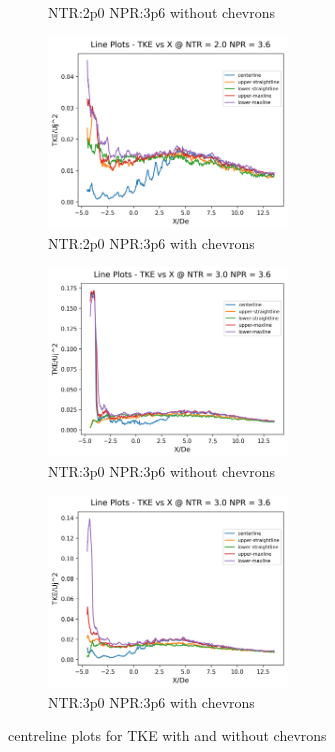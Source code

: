 \begin{figure}[H]
\begin{subfigure}{.5\textwidth}
	\caption{NTR:2p0 NPR:3p6 without chevrons}
	\label{fig:lineplotsTKE2p03p6}
\end{subfigure}%
\begin{subfigure}{.5\textwidth}
	\centering
	\includegraphics[width=2.5in]{images/LinePlots_TKE_NTR2p0_NPR3p6c.png}
	\caption{NTR:2p0 NPR:3p6 with chevrons}
	\label{fig:lineplotsTKE2p03p6c}
\end{subfigure}
\begin{subfigure}{.5\textwidth}
	\centering
	\includegraphics[width=2.5in]{images/LinePlots_TKE_NTR3p0_NPR3p6.png}
	\caption{NTR:3p0 NPR:3p6 without chevrons}
	\label{fig:lineplotsTKE3p03p6}
\end{subfigure}%
\begin{subfigure}{.5\textwidth}
	\centering
	\includegraphics[width=2.5in]{images/LinePlots_TKE_NTR3p0_NPR3p6c.png}
	\caption{NTR:3p0 NPR:3p6 with chevrons}
	\label{fig:lineplotsTKE3p03p6c}
\end{subfigure}
\caption{centreline plots for TKE with and without chevrons }
\label{fig:lineplotsTKE}
\end{figure}


